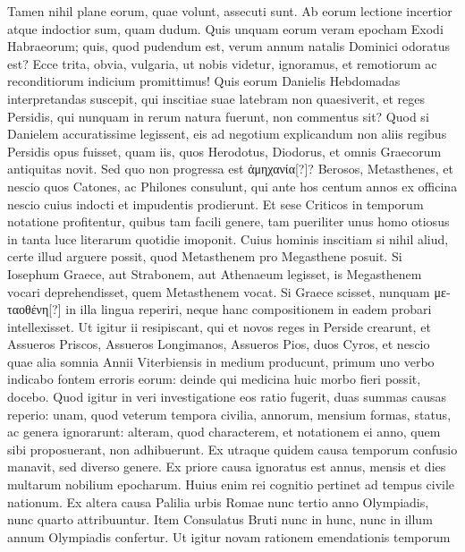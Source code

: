 Tamen nihil plane eorum, quae volunt,
assecuti sunt.
Ab eorum lectione incertior atque indoctior sum,
quam dudum.
Quis unquam eorum veram epocham Exodi Habraeorum;
quis, quod pudendum est, verum annum natalis Dominici odoratus
est?
Ecce trita, obvia, vulgaria, ut nobis videtur, ignoramus, et remotiorum
ac reconditiorum indicium promittimus!
Quis eorum Danielis
Hebdomadas interpretandas suscepit, qui inscitiae suae latebram
non quaesiverit, et reges Persidis, qui nunquam in rerum natura fuerunt,
non commentus sit?
%
Quod si Danielem accuratissime legissent,
eis ad negotium explicandum non aliis regibus Persidis opus fuisset,
quam iis, quos Herodotus, Diodorus, et omnis Graecorum antiquitas
novit.
Sed quo non progressa est \textgreek{ἀμηχανία[?]}?
Berosos, Metasthenes, et
nescio quos Catones, ac Philones consulunt, qui ante hos centum annos
ex officina nescio cuius indocti et impudentis prodierunt.
Et sese
Criticos in temporum notatione profitentur, quibus tam facili genere,
tam pueriliter unus homo otiosus in tanta luce literarum quotidie imoponit.
Cuius hominis inscitiam si nihil aliud, certe illud arguere
 possit, quod
Metasthenem pro Megasthene posuit.
Si Iosephum Graece, aut Strabonem,
aut Athenaeum legisset, is Megasthenem vocari deprehendisset,
quem Metasthenem vocat.
Si Graece scisset, nunquam \textgreek{μεταοθένη[?]} in illa
lingua reperiri, neque hanc compositionem in eadem probari intellexisset.
Ut igitur ii resipiscant, qui et novos reges in Perside crearunt,
et Assueros Priscos, Assueros Longimanos, Assueros Pios, duos Cyros,
et nescio quae alia somnia Annii Viterbiensis in medium producunt,
primum uno verbo indicabo fontem erroris eorum: deinde qui medicina
huic morbo fieri possit, docebo.
Quod igitur in veri investigatione
eos ratio fugerit, duas summas causas reperio: unam, quod veterum
tempora civilia, annorum, mensium formas, status, ac genera ignorarunt:
alteram, quod characterem, et notationem ei anno, quem sibi
proposuerant, non adhibuerunt.
Ex utraque quidem causa temporum
confusio manavit, sed diverso genere.
Ex priore causa ignoratus est
annus, mensis et dies multarum nobilium epocharum.
Huius enim
rei cognitio pertinet ad tempus civile nationum.
Ex altera causa Palilia
urbis Romae nunc tertio anno Olympiadis, nunc quarto attribuuntur.
Item Consulatus Bruti nunc in hunc, nunc in illum annum
Olympiadis confertur.
Ut igitur novam rationem emendationis temporum
